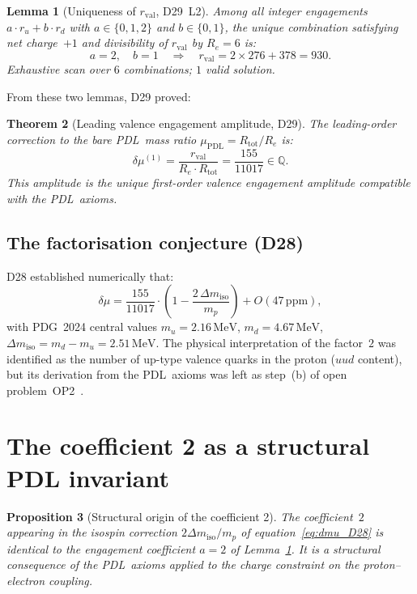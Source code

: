 \documentclass[11pt,a4paper]{article}
\newtheorem{theorem}{Theorem}[section]
\newtheorem{proposition}[theorem]{Proposition}
\newtheorem{lemma}[theorem]{Lemma}
\theoremstyle{definition}
\newcommand{\PDL}{\textnormal{PDL}}
\newcommand{\Rtot}{R_{\mathrm{tot}}}
\newcommand{\rval}{r_{\mathrm{val}}}
\newcommand{\muPDL}{\mu_{\mathrm{PDL}}}
\newcommand{\dmu}{\delta\mu}
\newcommand{\dmuLO}{\dmu^{(1)}}
\newcommand{\dmiso}{\Delta m_{\mathrm{iso}}}
\newcommand{\Ree}{R_e}
\begin{document}
\begin{lemma}[Uniqueness of $\rval$, D29~L2]
\label{lem:L2}
Among all integer engagements $a\cdot r_u + b\cdot r_d$ with $a\in\{0,1,2\}$ and $b\in\{0,1\}$, the unique combination satisfying net charge~$+1$ and divisibility of $\rval$ by $\Ree = 6$ is:
\begin{equation}
a = 2,\quad b = 1 \quad\Longrightarrow\quad \rval = 2\times 276 + 378 = 930.
\label{eq:L2}
\end{equation}
Exhaustive scan over $6$ combinations; $1$ valid solution.
\end{lemma}

From these two lemmas, D29 proved:

\begin{theorem}[Leading valence engagement amplitude, D29]
\label{thm:D29}
The leading-order correction to the bare \PDL\ mass ratio $\muPDL = \Rtot/\Ree$ is:
\begin{equation}
\dmuLO = \frac{\rval}{\Ree\cdot\Rtot} = \frac{155}{11017} \in \mathbb{Q}.
\label{eq:dmuLO}
\end{equation}
This amplitude is the unique first-order valence engagement amplitude compatible with the \PDL\ axioms.
\end{theorem}

\subsection{The factorisation conjecture (D28)}
\label{subsec:D28}

D28 established numerically that:
\begin{equation}
\dmu = \frac{155}{11017}\cdot\left(1-\frac{2\,\dmiso}{m_p}\right) + O(47\,\mathrm{ppm}),
\label{eq:dmu_D28}
\end{equation}
with PDG~2024 central values $m_u = 2.16\,\mathrm{MeV}$, $m_d = 4.67\,\mathrm{MeV}$, $\dmiso = m_d - m_u = 2.51\,\mathrm{MeV}$. The physical interpretation of the factor~$2$ was identified as the number of up-type valence quarks in the proton ($uud$ content), but its derivation from the \PDL\ axioms was left as step~(b) of open problem~OP2~\cite{PDL_D28_2026}.

\section{The coefficient 2 as a structural PDL invariant}
\label{sec:coefficient2}

\begin{proposition}[Structural origin of the coefficient 2]
\label{prop:coeff2}
The coefficient~$2$ appearing in the isospin correction $2\dmiso/m_p$ of equation~\eqref{eq:dmu_D28} is identical to the engagement coefficient $a = 2$ of Lemma~\ref{lem:L2}. It is a structural consequence of the \PDL\ axioms applied to the charge constraint on the proton--electron coupling.
\end{proposition}
\end{document}
